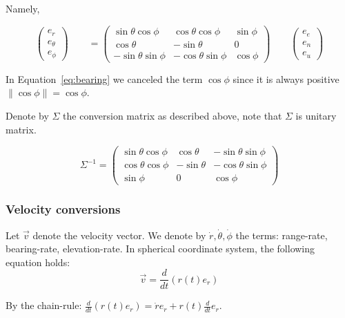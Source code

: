 \documentclass{article}
\newcommand{\east}{e_e}
\newcommand{\north}{e_n}
\newcommand{\up}{e_u}
\newcommand{\range}{e_r}
\newcommand{\bearing}{e_\theta}
\newcommand{\elevation}{e_\phi}
\newcommand{\rrate}{\dot{r}}
\newcommand{\brate}{\dot{\theta}}
\newcommand{\erate}{\dot{\phi}}
\begin{document}
Namely,

\begin{equation}\label{eq:matrix}
\begin{pmatrix}
    \range \\
   \bearing \\
    \elevation
  \end{pmatrix}
  \qquad
  = \begin{pmatrix}
    \sin \theta \cos \phi & \cos \theta \cos \phi &  \sin \phi \\
   \cos \theta &  -\sin \theta & 0 \\
    -\sin \theta \sin \phi & -\cos \theta \sin \phi &  \cos \phi
  \end{pmatrix}
  \qquad
  \begin{pmatrix}
    \east \\
   \north \\
    \up
  \end{pmatrix}
\end{equation}

In Equation~\ref{eq:bearing} we canceled the term $\cos \phi$
since it is always positive $\| \cos \phi \| = \cos \phi$.

Denote by $\Sigma$ the conversion matrix as described above, note that $\Sigma$
is unitary matrix.

\begin{equation}
\Sigma^{-1} = \begin{pmatrix}
    \sin \theta \cos \phi & \cos \theta &  - \sin \theta \sin \phi \\
   \cos \theta \cos \phi &  -\sin \theta & -\cos \theta \sin \phi \\
    \sin \phi & 0 &  \cos \phi
  \end{pmatrix}
\end{equation}

\subsubsection{Velocity conversions}
Let $\vec{v}$ denote the velocity vector. We denote by $\rrate, \brate, \erate$ the terms: range-rate, bearing-rate,
elevation-rate.
In spherical coordinate system, the
following equation holds:
\begin{equation}
\vec{v} = \frac{d}{dt} (r(t) \range)
\end{equation}

By the chain-rule: $\frac{d}{dt} (r(t) \range) = \rrate \range + r(t)
\frac{d}{dt} \range$.
\end{document}
